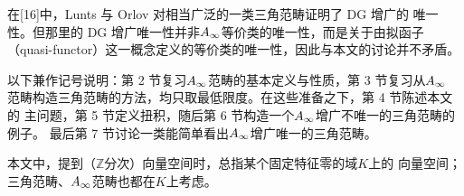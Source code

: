 在[16]中，Lunts 与 Orlov 对相当广泛的一类三角范畴证明了 DG 增广的
唯一性。但那里的 DG 增广唯一性并非$A_{\infty}$等价类的唯一性，而是关于由拟函子
（quasi-functor）这一概念定义的等价类的唯一性，因此与本文的讨论并不矛盾。


以下兼作记号说明：第 2 节复习$A_{\infty}$范畴的基本定义与性质，第 3 节复习从$A_{\infty}$
范畴构造三角范畴的方法，均只取最低限度。在这些准备之下，第 4 节陈述本文的
主问题，第 5 节定义扭积，随后第 6 节构造一个$A_{\infty}$增广不唯一的三角范畴的例子。
最后第 7 节讨论一类能简单看出$A_{\infty}$增广唯一的三角范畴。

本文中，提到（$\mathbb{Z}$分次）向量空间时，总指某个固定特征零的域$K$上的
向量空间；三角范畴、$A_{\infty}$范畴也都在$K$上考虑。
